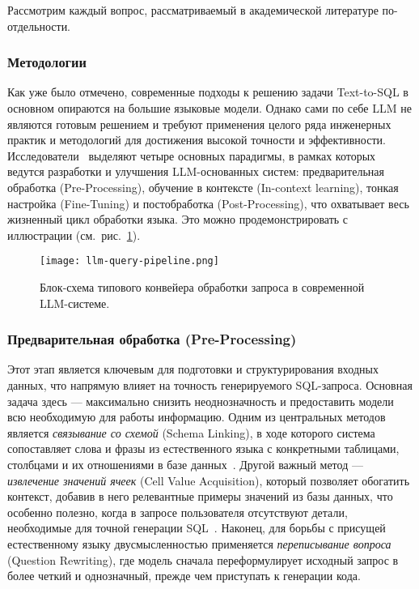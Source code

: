 \noindent Рассмотрим каждый вопрос, рассматриваемый в академической литературе по-отдельности.

\subsubsection{Методологии}

Как уже было отмечено, современные подходы к решению задачи Text-to-SQL в основном опираются
на большие языковые модели. Однако сами по себе LLM не являются готовым решением и
требуют применения целого ряда инженерных практик и методологий для достижения
высокой точности и эффективности. Исследователи~\cite{huangExploringLandscapeTexttoSQL2025}
выделяют четыре основных парадигмы, в рамках которых ведутся разработки и улучшения
LLM-основанных систем: предварительная обработка (Pre-Processing),
обучение в контексте (In-context learning), тонкая настройка (Fine-Tuning) и
постобработка (Post-Processing), что охватывает весь жизненный цикл обработки языка.
Это можно продемонстрировать с иллюстрации (см.~рис.~\ref{fig:llm-query-pipeline}).

\begin{figure}[!ht]
	\centering
	\texttt{[image: llm-query-pipeline.png]}
	\caption{Блок-схема типового конвейера обработки запроса в современной LLM-системе.}
	\label{fig:llm-query-pipeline}
\end{figure}


\subsubsection{Предварительная обработка (Pre-Processing)}

Этот этап является ключевым
для подготовки и структурирования входных данных, что напрямую влияет на точность
генерируемого SQL-запроса. Основная задача здесь --- максимально снизить неоднозначность
и предоставить модели всю необходимую для работы информацию.
Одним из центральных методов является \textit{связывание со схемой} (Schema Linking), в
ходе которого система сопоставляет слова и фразы из естественного языка с конкретными таблицами,
столбцами и их отношениями в базе данных~\cite{huangExploringLandscapeTexttoSQL2025,
	mohammadjafariNaturalLanguageSQL2025}. Другой важный метод --- \textit{извлечение значений ячеек}
(Cell Value Acquisition), который позволяет обогатить контекст, добавив в него
релевантные примеры значений из базы данных, что особенно полезно, когда в запросе
пользователя отсутствуют детали, необходимые для точной генерации
SQL~\cite{huangExploringLandscapeTexttoSQL2025}. Наконец, для борьбы с присущей
естественному языку двусмысленностью применяется \textit{переписывание вопроса}
(Question Rewriting), где модель сначала переформулирует исходный запрос в более
четкий и однозначный, прежде чем приступать к генерации кода.

